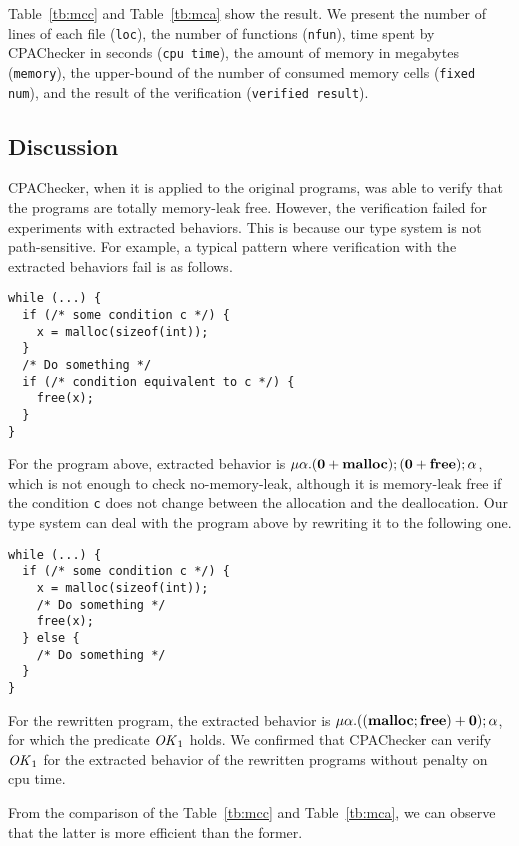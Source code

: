 Table~\ref{tb:mcc} and Table~\ref{tb:mca} show the result.  We present
the number of lines of each file (\texttt{loc}), the number of
functions (\texttt{nfun}), time spent by CPAChecker in seconds
(\texttt{cpu time}), the amount of memory in megabytes
(\texttt{memory}), the upper-bound of the number of consumed memory
cells (\texttt{fixed num}), and the result of the verification
(\texttt{verified result}).

\subsection{Discussion}

CPAChecker, when it is applied to the original programs, was able to
verify that the programs are totally memory-leak free.  However, the
verification failed for experiments with extracted behaviors.  This is
because our type system is not path-sensitive.  For example, a typical
pattern where verification with the extracted behaviors fail is as
follows.
\begin{verbatim}
while (...) {
  if (/* some condition c */) {
    x = malloc(sizeof(int));
  }
  /* Do something */
  if (/* condition equivalent to c */) {
    free(x);
  }
}
\end{verbatim}
For the program above, extracted behavior is \(\mu\alpha. (\mathbf{0}
+ \mathbf{malloc}); (\mathbf{0} + \mathbf{free}); \alpha\), which is not enough to
check no-memory-leak, although it is memory-leak free if the condition
\texttt{c} does not change between the allocation and the
deallocation.  Our type system can deal with the program above by
rewriting it to the following one.
\begin{verbatim}
while (...) {
  if (/* some condition c */) {
    x = malloc(sizeof(int));
    /* Do something */
    free(x);
  } else {
    /* Do something */
  }
}
\end{verbatim}
For the rewritten program, the extracted behavior is
\(\mu\alpha. ((\mathbf{malloc}; \mathbf{free}) + \mathbf{0}); \alpha\), for which the
predicate \(\mathit{OK}_1\) holds.  We confirmed that CPAChecker can verify
\(\mathit{OK}_1\) for the extracted behavior of the rewritten programs without
penalty on cpu time.

From the comparison of the Table~\ref{tb:mcc} and Table~\ref{tb:mca},
we can observe that the latter is more efficient than the former.



